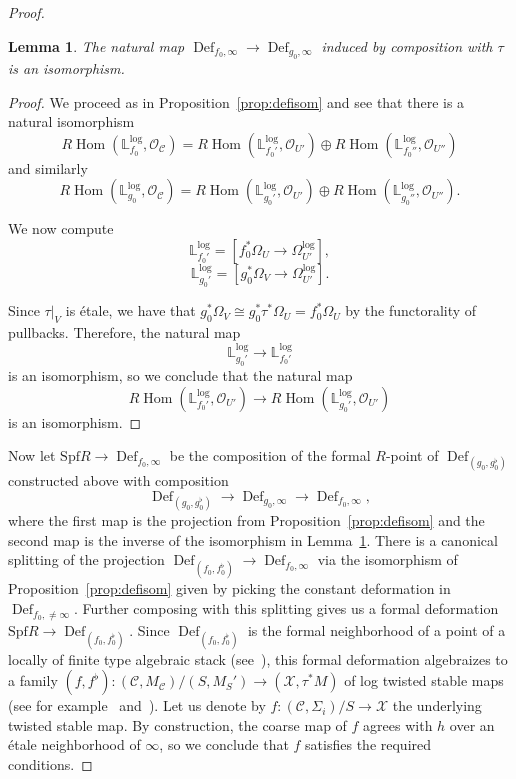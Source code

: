 \documentclass[11pt]{amsart}
\numberwithin{equation}{section}
\newtheorem{lemma}[theorem]{Lemma}
\theoremstyle{definition}
\theoremstyle{remark}
\newcommand{\bLl}{\mathbb L^{\mathrm{log}}}
\DeclareMathOperator{\Hom}{Hom}
\DeclareMathOperator{\Def}{Def}
\newcommand{\calO}{\mathcal O}
\newcommand{\calX}{\mathcal X}
\newcommand{\calC}{\mathcal C}
\newcommand{\Spf}{\mathrm{Spf}}
\renewcommand{\log}{\mathrm{log}}
\begin{document}
\begin{proof}
\begin{lemma}\label{lem:naturalmap}
The natural map $\Def_{f_0, \infty} \to \Def_{g_0, \infty}$ induced by composition with $\tau$ is an isomorphism.
\end{lemma}

\begin{proof} We proceed as in Proposition~\ref{prop:defisom} and see that there is a natural isomorphism 
$$
R\Hom(\bLl_{f_0}, \calO_{\calC}) = R\Hom(\bLl_{f_0'}, \calO_{U'}) \oplus R\Hom(\bLl_{f_0''}, \calO_{U''})
$$
and similarly
$$
R\Hom(\bLl_{g_0}, \calO_{\calC}) = R\Hom(\bLl_{g_0'}, \calO_{U'}) \oplus R\Hom(\bLl_{g_0''}, \calO_{U''}).
$$

We now compute
$$
\bLl_{f_0'} = [f_0^*\Omega_{U} \to \Omega^{\log}_{U'}],
$$
$$
\bLl_{g_0'} = [g_0^*\Omega_{V} \to \Omega^{\log}_{U'}].
$$

\noindent Since $\tau|_V$ is \'etale, we have that $g_0^*\Omega_V \cong g_0^*\tau^*\Omega_U = f_0^*\Omega_U$ by the functorality of pullbacks. Therefore, the natural map
$$
\bLl_{g_0'} \to \bLl_{f_0'}
$$
is an isomorphism, so we conclude that the natural map
$$
R\Hom(\bLl_{f_0'}, \calO_{U'}) \to R\Hom(\bLl_{g_0'}, \calO_{U'})
$$
is an isomorphism.  \end{proof}

Now let $\Spf R \to \Def_{f_0, \infty}$ be the composition of the formal $R$-point of $\Def_{(g_0, g_0^\flat)}$ constructed above with composition
$$
\Def_{(g_0, g_0^\flat)} \to \Def_{g_0, \infty} \to \Def_{f_0, \infty}, 
$$
where the first map is the projection from Proposition~\ref{prop:defisom} and the second map is the inverse of the isomorphism in Lemma~\ref{lem:naturalmap}. There is a canonical splitting of the projection $\Def_{(f_0, f_0^\flat)} \to \Def_{f_0, \infty}$ via the isomorphism of Proposition~\ref{prop:defisom} given by picking the constant deformation in $\Def_{f_0, \neq \infty}$. Further composing with this splitting gives us a formal deformation $\Spf R \to \Def_{(f_0, f_0^\flat)}$. Since $\Def_{(f_0, f_0^\flat)}$ is the formal neighborhood of a point of a locally of finite type algebraic stack (see~\cite{Chen, GS}), this formal deformation algebraizes to a family $(f,f^\flat) \colon  (\calC, M_{\calC})/(S, M_S') \to (\calX, \tau^*M)$ of log twisted stable maps (see for example~\cite[Theorem 1.1]{Bhatt} and~\cite[Corollary 1.5]{BDHL}). Let us denote by $f \colon  (\calC, \Sigma_i)/S \to \calX$ the underlying twisted stable map. By construction, the coarse map of $f$ agrees with $h$ over an \'etale neighborhood of $\infty$, so we conclude that $f$ satisfies the required conditions. \end{proof}
\end{document}

